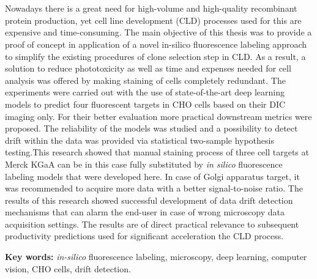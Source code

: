 \section*{}

Nowadays there is a great need for high-volume and high-quality recombinant protein production, yet cell line development (CLD) processes used for this are expensive and time-consuming. The main objective of this thesis was to provide a proof of concept in application of a novel in-silico fluorescence labeling approach to simplify the existing procedures of clone selection step in CLD. As a result, a solution to reduce phototoxicity as well as time and expenses needed for cell analysis was offered by making staining of cells completely redundant. The experiments were carried out with the use of state-of-the-art deep learning models to predict four fluorescent targets in CHO cells based on their DIC imaging only. For their better evaluation more practical downstream metrics were proposed. The reliability of the models was studied and a possibility to detect drift within the data was provided via statistical two-sample hypothesis testing.This research showed that manual staining process of three cell targets at Merck KGaA can be in this case fully substituted by \textit{in silico} fluorescence labeling models that were developed here. In case of Golgi apparatus target, it was recommended to acquire more data with a better signal-to-noise ratio. The results of this research showed successful development of data drift detection mechanisms that can alarm the end-user in case of wrong microscopy data acquisition settings. The results are of direct practical relevance to subsequent productivity predictions used for significant acceleration the CLD process.

\textbf{Key words:} \textit{in-silico} fluorescence labeling, microscopy, deep learning, computer vision, CHO cells, drift detection.